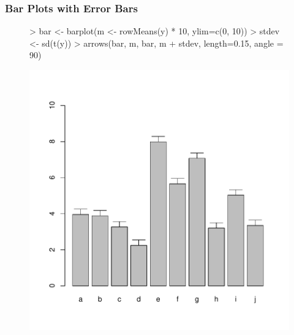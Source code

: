 \documentclass{beamer}
\begin{document}
\begin{frame}[containsverbatim]  
	\frametitle{Bar Plots with Error Bars}
\scriptsize
\begin{figure}
  \centering
\begin{Schunk}
\begin{Sinput}
> bar <- barplot(m <- rowMeans(y) * 10, ylim=c(0, 10))
> stdev <- sd(t(y))
> arrows(bar, m, bar, m + stdev, length=0.15, angle = 90)
\end{Sinput}
\end{Schunk}
\includegraphics{fig--015}
\label{ig:bar_plot2}
\end{figure}
\end{frame}
\end{document}
